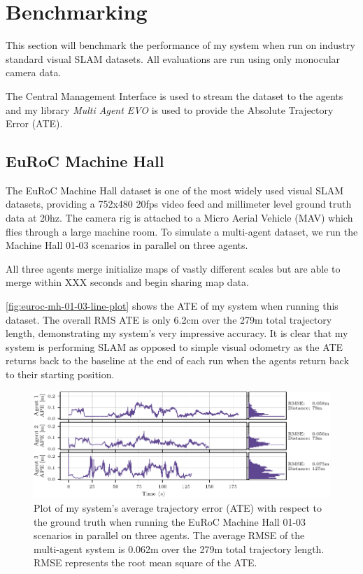 \section{Benchmarking}
\label{sec:benchmarking}
This section will benchmark the performance of my system when run on industry standard visual SLAM datasets. All evaluations are run using only monocular camera data.

The Central Management Interface is used to stream the dataset to the agents and my library \textit{Multi Agent EVO} is used to provide the Absolute Trajectory Error (ATE).

\subsection{EuRoC Machine Hall}
\label{sec:euroc-machine-hall}
The EuRoC Machine Hall dataset \autocite{burri2016euroc} is one of the most widely used visual SLAM datasets, providing a 752x480 20fps video feed and millimeter level ground truth data at 20hz. The camera rig is attached to a Micro Aerial Vehicle (MAV) which flies through a large machine room. To simulate a multi-agent dataset, we run the Machine Hall 01-03 scenarios in parallel on three agents.

All three agents merge initialize maps of vastly different scales but are able to merge within XXX seconds and begin sharing map data.

\autoref{fig:euroc-mh-01-03-line-plot} shows the ATE of my system when running this dataset. The overall RMS ATE is only 6.2cm over the 279m total trajectory length, demonstrating my system's very impressive accuracy. It is clear that my system is performing SLAM as opposed to simple visual odometry as the ATE returns back to the baseline at the end of each run when the agents return back to their starting position.

\begin{figure}[h]
    \centering
    \includegraphics[width=\linewidth]{figures/EuRoC_MH_01-03_line_plot.pdf}

    \caption{Plot of my system's average trajectory error (ATE) with respect to the ground truth when running the EuRoC Machine Hall 01-03 scenarios in parallel on three agents. The average RMSE of the multi-agent system is 0.062m over the 279m total trajectory length. \captionbreak RMSE represents the root mean square of the ATE.}
    \label{fig:euroc-mh-01-03-line-plot}
\end{figure}

